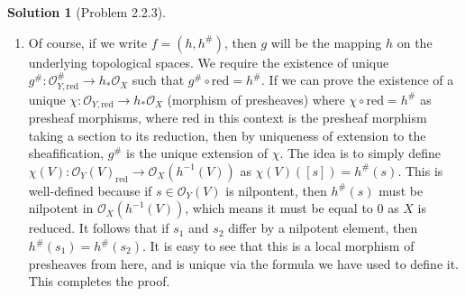 \documentclass[aps,pra,showpacs,notitlepage,onecolumn,superscriptaddress,nofootinbib]{revtex4-1}
\theoremstyle{definition}
\newtheorem{solution}{Solution}[section]
\begin{document}
\begin{solution}[Problem 2.2.3]
\begin{enumerate}
        \item Of course, if we write $f = (h, h^{\#})$, then $g$ will be the mapping $h$ on the underlying topological spaces. We require the existence of unique $g^{\#} : \mathcal{O}_{Y, \text{red}}^{\#} \rightarrow h_{*} \mathcal{O}_X$
          such that $g^{\#} \circ \text{red} = h^{\#}$. If we can prove the existence of a unique $\chi : \mathcal{O}_{Y, \text{red}} \rightarrow h_{*} \mathcal{O}_X$ (morphism of presheaves) where $\chi \circ \text{red} = h^{\#}$ as
          presheaf morphisms, where $\text{red}$ in this context is the presheaf morphism taking a section to its reduction, then by uniqueness of extension to the sheafification, $g^{\#}$ is the unique extension of $\chi$.
          The idea is to simply define $\chi(V) : \mathcal{O}_Y(V)_{\text{red}} \rightarrow \mathcal{O}_X(h^{-1}(V))$ as $\chi(V)([s]) = h^{\#}(s)$. This is well-defined because if $s \in \mathcal{O}_Y(V)$ is nilpontent, then
          $h^{\#}(s)$ must be nilpotent in $\mathcal{O}_X(h^{-1}(V))$, which means it must be equal to $0$ as $X$ is reduced. It follows that if $s_1$ and $s_2$ differ by a nilpotent element, then $h^{\#}(s_1) = h^{\#}(s_2)$.
          It is easy to see that this is a local morphism of presheaves from here, and is unique via the formula we have used to define it. This completes the proof.
    \end{enumerate}
  \end{solution}
\end{document}
